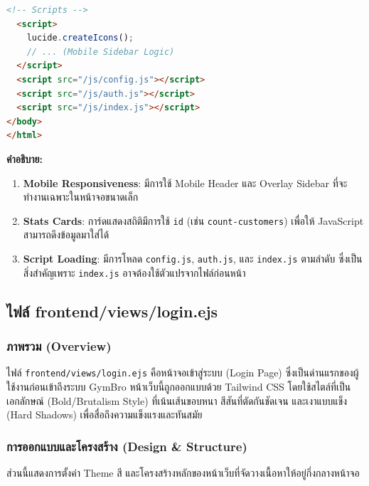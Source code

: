 \begin{lstlisting}[language=HTML, caption={ซอร์สโค้ดจากไฟล์ frontend/views/index.ejs: Main Content}, label={code:views-index-main}]
  <!-- Scripts -->
  <script>
    lucide.createIcons();
    // ... (Mobile Sidebar Logic)
  </script>
  <script src="/js/config.js"></script>
  <script src="/js/auth.js"></script>
  <script src="/js/index.js"></script>
</body>
</html>
\end{lstlisting}

\textbf{คำอธิบาย:}
\begin{enumerate}
    \item \textbf{Mobile Responsiveness}: มีการใช้ Mobile Header และ Overlay Sidebar ที่จะทำงานเฉพาะในหน้าจอขนาดเล็ก
    \item \textbf{Stats Cards}: การ์ดแสดงสถิติมีการใช้ \texttt{id} (เช่น \texttt{count-customers}) เพื่อให้ JavaScript สามารถดึงข้อมูลมาใส่ได้
    \item \textbf{Script Loading}: มีการโหลด \texttt{config.js}, \texttt{auth.js}, และ \texttt{index.js} ตามลำดับ ซึ่งเป็นสิ่งสำคัญเพราะ \texttt{index.js} อาจต้องใช้ตัวแปรจากไฟล์ก่อนหน้า
\end{enumerate}


\subsection{ไฟล์ frontend/views/login.ejs}

\subsubsection{ภาพรวม (Overview)}
\begin{sloppypar}
ไฟล์ \texttt{frontend/views/login.ejs} คือหน้าจอเข้าสู่ระบบ (Login Page) ซึ่งเป็นด่านแรกของผู้ใช้งานก่อนเข้าถึงระบบ GymBro หน้าเว็บนี้ถูกออกแบบด้วย Tailwind CSS โดยใช้สไตล์ที่เป็นเอกลักษณ์ (Bold/Brutalism Style) ที่เน้นเส้นขอบหนา สีสันที่ตัดกันชัดเจน และเงาแบบแข็ง (Hard Shadows) เพื่อสื่อถึงความแข็งแรงและทันสมัย
\end{sloppypar}

\subsubsection{การออกแบบและโครงสร้าง (Design \& Structure)}
ส่วนนี้แสดงการตั้งค่า Theme สี และโครงสร้างหลักของหน้าเว็บที่จัดวางเนื้อหาให้อยู่กึ่งกลางหน้าจอ

